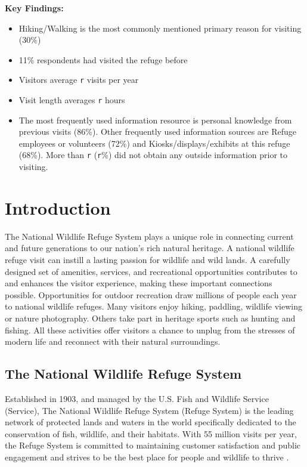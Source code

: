 \documentclass[]{book}
\providecommand{\tightlist}{%
  \setlength{\itemsep}{0pt}\setlength{\parskip}{0pt}}
\begin{document}
\textbf{Key Findings:}

\begin{itemize}
\tightlist
\item
  Hiking/Walking is the most commonly mentioned primary reason for
  visiting (30\%)
\item
  11\% respondents had visited the refuge before
\item
  Visitors average \texttt{r} visits per year
\item
  Visit length averages \texttt{r} hours
\item
  The most frequently used information resource is personal knowledge
  from previous visits (86\%). Other frequently used information sources
  are Refuge employees or volunteers (72\%) and Kiosks/displays/exhibits
  at this refuge (68\%). More than \texttt{r} (\texttt{r}\%) did not
  obtain any outside information prior to visiting.
\end{itemize}

\chapter{Introduction}\label{intro}

The National Wildlife Refuge System plays a unique role in connecting
current and future generations to our nation's rich natural heritage. A
national wildlife refuge visit can instill a lasting passion for
wildlife and wild lands. A carefully designed set of amenities,
services, and recreational opportunities contributes to and enhances the
visitor experience, making these important connections possible.
Opportunities for outdoor recreation draw millions of people each year
to national wildlife refuges. Many visitors enjoy hiking, paddling,
wildlife viewing or nature photography. Others take part in heritage
sports such as hunting and fishing. All these activities offer visitors
a chance to unplug from the stresses of modern life and reconnect with
their natural surroundings.

\section*{The National Wildlife Refuge
System}\label{the-national-wildlife-refuge-system}

Established in 1903, and managed by the U.S. Fish and Wildlife Service
(Service), The National Wildlife Refuge System (Refuge System) is the
leading network of protected lands and waters in the world specifically
dedicated to the conservation of fish, wildlife, and their habitats.
With 55 million visits per year, the Refuge System is committed to
maintaining customer satisfaction and public engagement and strives to
be the best place for people and wildlife to thrive \citep{USFWS2018}.
\end{document}
